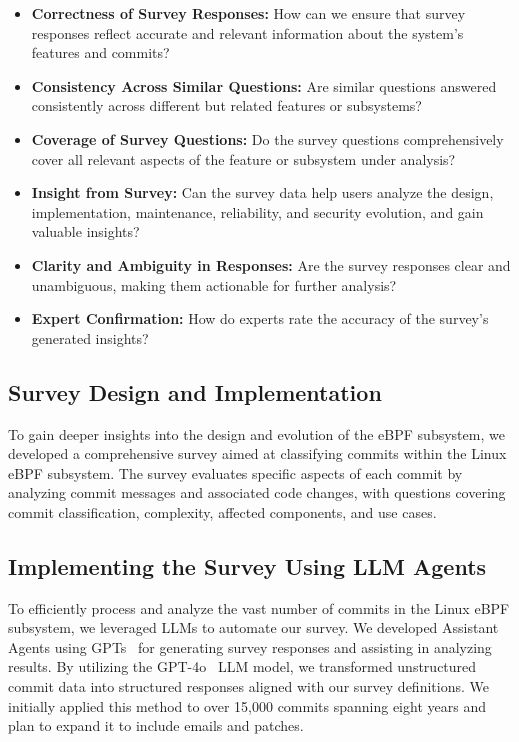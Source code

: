 \begin{itemize}
    \item \textbf{Correctness of Survey Responses:} How can we ensure that survey responses reflect accurate and relevant information about the system's features and commits?
    \item \textbf{Consistency Across Similar Questions:} Are similar questions answered consistently across different but related features or subsystems?
    \item \textbf{Coverage of Survey Questions:} Do the survey questions comprehensively cover all relevant aspects of the feature or subsystem under analysis?
    \item \textbf{Insight from Survey:} Can the survey data help users analyze the design, implementation, maintenance, reliability, and security evolution, and gain valuable insights?
    \item \textbf{Clarity and Ambiguity in Responses:} Are the survey responses clear and unambiguous, making them actionable for further analysis?

    \item \textbf{Expert Confirmation:} How do experts rate the accuracy of the survey's generated insights?
\end{itemize}

\subsection{Survey Design and Implementation}

To gain deeper insights into the design and evolution of the eBPF subsystem, we developed a comprehensive survey aimed at classifying commits within the Linux eBPF subsystem. The survey evaluates specific aspects of each commit by analyzing commit messages and associated code changes, with questions covering commit classification, complexity, affected components, and use cases.

\subsection{Implementing the Survey Using LLM Agents}

To efficiently process and analyze the vast number of commits in the Linux eBPF subsystem, we leveraged LLMs to automate our survey. We developed Assistant Agents using GPTs~\cite{gpts} for generating survey responses and assisting in analyzing results. By utilizing the GPT-4o~\cite{gpt4o} LLM model, we transformed unstructured commit data into structured responses aligned with our survey definitions. We initially applied this method to over 15,000 commits spanning eight years and plan to expand it to include emails and patches.

